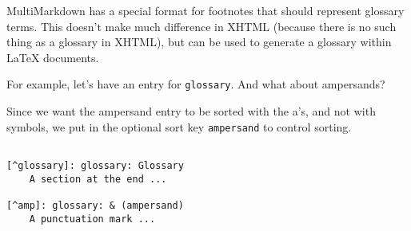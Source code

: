 
\def\mytitle{MultiMarkdown Glossary Test  }
\def\latexmode{memoir}

MultiMarkdown has a special format for footnotes that should represent
glossary terms. This doesn't make much difference in XHTML (because there is
no such thing as a glossary in XHTML), but can be used to generate a glossary
within LaTeX documents.

For example, let's have an entry for \texttt{glossary}. And what about
ampersands?\glsadd{& }

Since we want the ampersand entry to be sorted with the a's, and not with
symbols, we put in the optional sort key \texttt{ampersand} to control sorting.

\begin{adjustwidth}{2.5em}{2.5em}
\begin{verbatim}

[^glossary]: glossary: Glossary 
    A section at the end ...

[^amp]: glossary: & (ampersand)
    A punctuation mark ...

\end{verbatim}
\end{adjustwidth}




